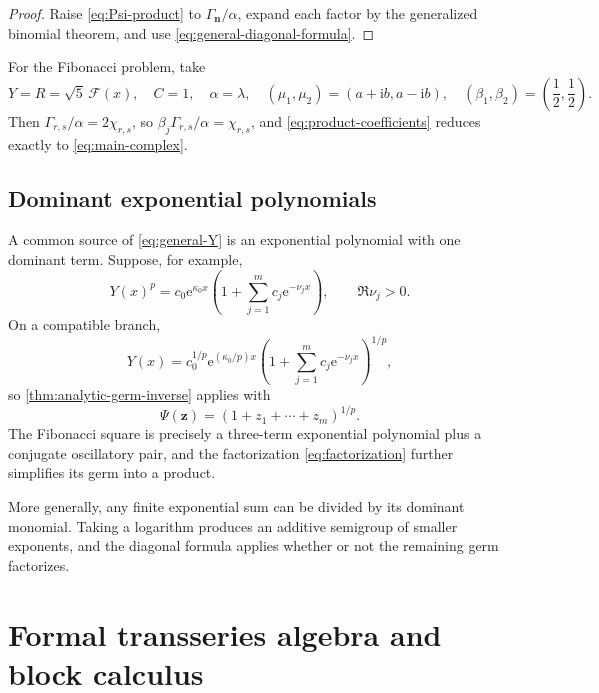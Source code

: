 \documentclass[11pt,oneside]{article}
\numberwithin{equation}{section}
\newcommand{\e}{\mathrm{e}}
\newcommand{\ii}{\mathrm{i}}
\newcommand{\cF}{\mathcal{F}}
\newcommand{\vct}[1]{\boldsymbol{#1}}
\begin{document}
\begin{proof}
Raise \cref{eq:Psi-product} to
\(\Gamma_{\vct n}/\alpha\), expand each factor by the generalized binomial
theorem, and use \cref{eq:general-diagonal-formula}.
\end{proof}

For the Fibonacci problem, take
\begin{equation}
  Y=R=\sqrt5\,\cF(x),\quad C=1,\quad \alpha=\lambda,
  \quad (\mu_1,\mu_2)=(a+\ii b,a-\ii b),
  \quad (\beta_1,\beta_2)=\left(\frac12,\frac12\right).
  \label{eq:Fibonacci-general-map}
\end{equation}
Then \(\Gamma_{r,s}/\alpha=2\chi_{r,s}\), so
\(\beta_j\Gamma_{r,s}/\alpha=\chi_{r,s}\), and
\cref{eq:product-coefficients} reduces exactly to
\cref{eq:main-complex}.

\subsection{Dominant exponential polynomials}

A common source of \cref{eq:general-Y} is an exponential polynomial with one
dominant term.  Suppose, for example,
\begin{equation}
  Y(x)^p=c_0\e^{\kappa_0x}
  \left(1+\sum_{j=1}^m c_j\e^{-\nu_jx}\right),
  \qquad \Re\nu_j>0.
  \label{eq:exp-polynomial}
\end{equation}
On a compatible branch,
\begin{equation}
  Y(x)=c_0^{1/p}\e^{(\kappa_0/p)x}
  \left(1+\sum_{j=1}^m c_j\e^{-\nu_jx}\right)^{1/p},
\end{equation}
so \cref{thm:analytic-germ-inverse} applies with
\begin{equation}
  \Psi(\vct z)=\left(1+z_1+\cdots+z_m\right)^{1/p}.
\end{equation}
The Fibonacci square is precisely a three-term exponential polynomial plus a
conjugate oscillatory pair, and the factorization
\cref{eq:factorization} further simplifies its germ into a product.

More generally, any finite exponential sum can be divided by its dominant
monomial.  Taking a logarithm produces an additive semigroup of smaller
exponents, and the diagonal formula applies whether or not the remaining germ
factorizes.

\section{Formal transseries algebra and block calculus}
\label{sec:formal-calculus}
\end{document}
